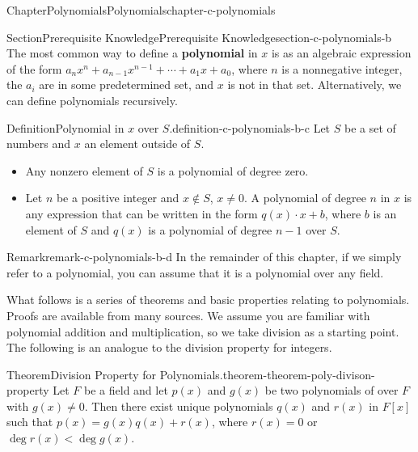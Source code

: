 \documentclass[oneside,10pt,]{book}
\newcommand{\terminology}[1]{\textbf{#1}}
\numberwithin{equation}{section}
\begin{document}
%
%
\typeout{************************************************}
\typeout{************************************************}
%
\begin{chapterptx}{Chapter}{Polynomials}{}{Polynomials}{}{}{chapter-c-polynomials}
\renewcommand*{\chaptername}{Chapter}
%
%
\typeout{************************************************}
\typeout{************************************************}
%
\begin{sectionptx}{Section}{Prerequisite Knowledge}{}{Prerequisite Knowledge}{}{}{section-c-polynomials-b}
The most common way to define a \terminology{polynomial} in \(x\) is as an algebraic expression of the form \(a_n x^n + a_{n-1}x^{n-1}+ \cdots +a_1 x + a_0\), where \(n\) is a nonnegative integer, the \(a_i\) are in some predetermined set, and \(x\) is not in that set.  Alternatively, we can define polynomials recursively.%
\begin{definition}{Definition}{Polynomial in \(x\) over \(S\).}{definition-c-polynomials-b-c}%
%
Let \(S\) be a set of numbers and \(x\) an element outside of \(S\).%
\begin{itemize}[label=\textbullet]
\item{}Any nonzero element of \(S\) is a polynomial of degree zero.%
\item{}Let \(n\) be a positive integer and \(x \notin S\), \(x \neq 0\).  A polynomial of degree \(n\) in \(x\) is any expression that can be written in the form \(q(x)\cdot x + b\), where \(b\) is an element of \(S\) and \(q(x)\) is a polynomial of degree \(n-1\) over \(S\).%
\end{itemize}
%
\end{definition}
\begin{remark}{Remark}{}{remark-c-polynomials-b-d}%
In the remainder of this chapter, if we simply refer to a polynomial, you can assume that it is a polynomial over any field.%
\end{remark}
What follows is a series of theorems and basic properties relating to polynomials.  Proofs are available from many sources.  We assume you are familiar with polynomial addition and multiplication, so we take division as a starting point.  The following is an analogue to the division property for integers.%
\begin{theorem}{Theorem}{Division Property for Polynomials.}{}{theorem-theorem-poly-divison-property}%
%
Let \(F\) be a field and let \(p(x)\) and \(g(x)\) be two polynomials of over \(F\) with \(g(x) \neq  0\). Then there exist unique polynomials \(q(x)\) and \(r(x)\) in \(F[x]\) such that \(p(x) = g(x) q(x) + r(x)\), where \(r(x) = 0\) or \(\deg  r(x) < \deg  g(x)\).%

\end{theorem}
\end{sectionptx}
\end{chapterptx}
\end{document}
